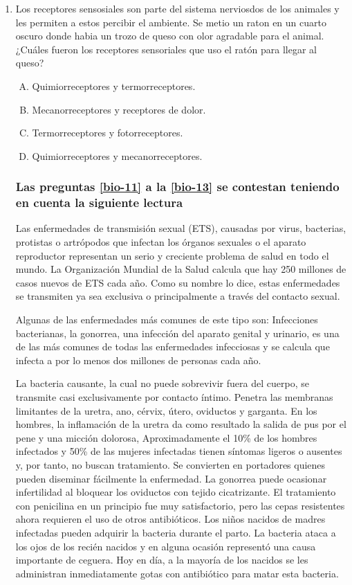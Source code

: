 \begin{enumerate}
\item Los receptores sensosiales son parte del sistema nerviosdos de los animales y les permiten a estos percibir el ambiente.  Se metio un raton en un  cuarto oscuro donde habia un trozo de queso con olor agradable para el animal.  ¿Cuáles fueron los receptores sensoriales que uso el ratón para llegar al queso? \label{bio-10}

\begin{enumerate}[(A)]
\item Quimiorreceptores y termorreceptores.
\item Mecanorreceptores y receptores de dolor.
\item Termorreceptores y fotorreceptores.
\item Quimiorreceptores y mecanorreceptores.
\end{enumerate}


\subsubsection*{Las preguntas \ref{bio-11} a la \ref{bio-13}  se contestan teniendo en cuenta la siguiente lectura}

Las enfermedades de transmisión sexual (ETS), causadas por virus, bacterias, protistas o artrópodos que infectan los órganos sexuales o el aparato reproductor representan un serio y creciente problema de salud en todo el mundo. La Organización Mundial de la Salud calcula que hay 250 millones de casos nuevos de ETS cada año. Como su nombre lo dice, estas enfermedades se transmiten ya sea exclusiva o principalmente a través del contacto sexual. 


Algunas de las enfermedades más comunes de este tipo son: 
Infecciones bacterianas, la gonorrea, una infección del aparato genital y urinario, es una de las más comunes de todas las enfermedades infecciosas y se calcula que infecta a por lo menos dos millones de personas cada año. 

La bacteria causante, la cual no puede sobrevivir fuera del cuerpo, se transmite casi exclusivamente por contacto íntimo. Penetra las membranas limitantes de la uretra, ano, cérvix, útero, oviductos y garganta. En los hombres, la inflamación de la uretra da como resultado la salida de pus por el pene y una micción dolorosa, Aproximadamente el 10\% de los hombres infectados y 50\% de las mujeres infectadas tienen síntomas ligeros o ausentes y, por tanto, no buscan tratamiento. Se convierten en portadores quienes pueden diseminar fácilmente la enfermedad. La gonorrea puede ocasionar infertilidad al bloquear los oviductos con tejido cicatrizante. El tratamiento con penicilina en un principio fue muy satisfactorio, pero las cepas resistentes ahora requieren el uso de otros antibióticos. Los niños nacidos de madres infectadas pueden adquirir la bacteria durante el parto. La bacteria ataca a los ojos de los recién nacidos y en alguna ocasión representó una causa importante de ceguera. Hoy en día, a la mayoría de los nacidos se les administran inmediatamente gotas con antibiótico para matar esta bacteria. 


\end{enumerate}
